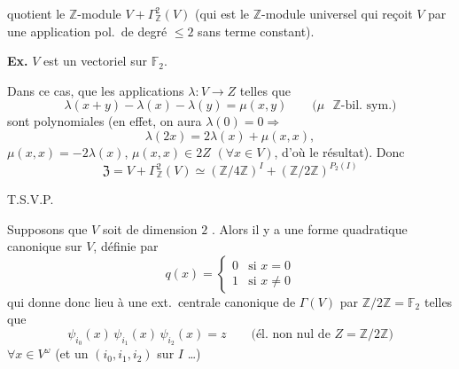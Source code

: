 \documentclass[11pt,a4paper]{article}
\begin{document}
quotient le $\mathbb{Z}$-module $V + \Gamma^2_{\mathbb{Z}}(V)$ (qui est le $\mathbb{Z}$-module universel qui reçoit $V$ par une application pol.\ de degré $\leq 2$ sans terme constant).

\textbf{Ex.} $V$ est un vectoriel  sur $\mathbb{F}_2$.

Dans ce cas,   que les applications $\lambda : V \to Z$ telles que
\[
\lambda(x + y) - \lambda(x) - \lambda(y) = \mu(x, y) \qquad \text{($\mu$ $\mathbb{Z}$-bil.\ sym.)}
\]
sont polynomiales (en effet, on aura $\lambda(0) = 0 \Rightarrow$ 
\[
\lambda(2x) = 2\lambda(x) + \mu(x, x),
\]
 $\mu(x, x) = -2\lambda(x)$,  $\mu(x, x) \in 2Z$ $(\forall x \in V)$, d'où  le résultat). Donc
\[
\mathfrak{Z} = V + \Gamma^2_{\mathbb{Z}}(V) \simeq (\mathbb{Z}/4\mathbb{Z})^{I} + (\mathbb{Z}/2\mathbb{Z})^{P_2(I)}
\]


T.S.V.P.


Supposons que $V$ soit de dimension $2$ . Alors il y a une forme quadratique canonique sur $V$, définie par
\[
q(x) =
\begin{cases}
0 & \text{si } x = 0\\
1 & \text{si } x \neq 0
\end{cases}
\]
qui donne donc lieu à une ext.\ centrale canonique de $\Gamma(V)$ par $\mathbb{Z}/2\mathbb{Z} = \mathbb{F}_2$ telles que
\[
\psi_{i_0}(x)\, \psi_{i_1}(x)\, \psi_{i_2}(x) = z \qquad \text{(él.\ non nul de $Z = \mathbb{Z}/2\mathbb{Z}$)}
\]
$\forall x \in V^\omega$ (et un   $(i_0, i_1, i_2)$ \struck{\ill{}} sur $I$ \ldots)
\end{document}
